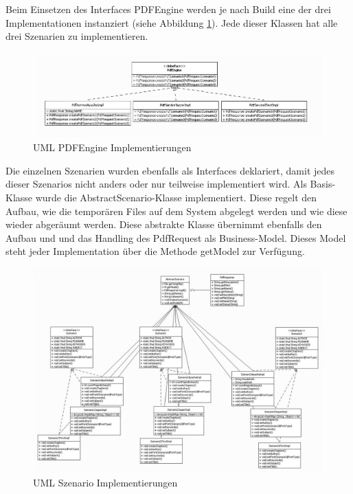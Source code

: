 \documentclass[main.tex]{subfiles}
\begin{document}
Beim Einsetzen des Interfaces PDFEngine werden je nach Build eine der drei Implementationen instanziert (siehe Abbildung \ref{figure:pdfEngineImpl}). Jede dieser Klassen hat alle drei Szenarien zu implementieren.  


\begin{figure}[h]
 
\includegraphics[width=\textwidth ]{pic/uml/PdfEngineImplemntierung.jpg}
 \caption{UML PDFEngine Implementierungen}
 \label{figure:pdfEngineImpl}
\end{figure}

Die einzelnen Szenarien wurden ebenfalls als Interfaces deklariert, damit jedes dieser Szenarios nicht anders oder nur teilweise implementiert wird. Als Basis-Klasse wurde die AbstractScenario-Klasse implementiert. Diese regelt den Aufbau, wie die temporären Files auf dem System abgelegt werden und wie diese wieder abgeräumt werden. Diese abstrakte Klasse übernimmt ebenfalls den Aufbau und und das Handling des PdfRequest als Business-Model. Dieses Model steht jeder Implementation über die Methode getModel zur Verfügung.   

\begin{figure}[h]
\includegraphics[width=\textwidth ]{pic/uml/SzenarioImplementation.jpg}
 \caption{UML Szenario Implementierungen}
 \label{figure:szenImpl}
\end{figure}
\end{document}
